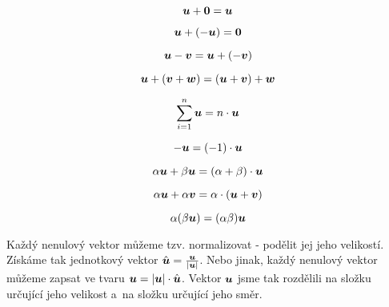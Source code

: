 \begin{fact}
\begin{equation}
\label{eq:euklidovsky_prostor_definice_nuloveho_vektoru}
\boldsymbol{u} + \boldsymbol{0} = \boldsymbol{u}
\end{equation}

\begin{equation}
\label{eq:euklidovsky_prostor_definice_opacneho_vektoru}
\boldsymbol{u} + (-\boldsymbol{u}) = \boldsymbol{0}
\end{equation}

\begin{equation}
\label{eq:euklidovsky_prostor_definice_odecitani_vektoru}
\boldsymbol{u} - \boldsymbol{v} = \boldsymbol{u} + (-\boldsymbol{v})
\end{equation}

\begin{equation}
\label{eq:euklidovsky_prostor_vektor_asociativita_scitani}
\boldsymbol{u} + (\boldsymbol{v} + \boldsymbol{w}) = (\boldsymbol{u} + \boldsymbol{v}) + \boldsymbol{w}
\end{equation}

\begin{equation}
\label{eq:euklidovsky_prostor_definice_nasobeni}
\sum_{i=1}^n \boldsymbol{u} = n \cdot \boldsymbol{u}
\end{equation}

\begin{equation}
\label{eq:euklidovsky_prostor_vektor_opacny}
-\boldsymbol{u} = (-1) \cdot \boldsymbol{u}
\end{equation}

\begin{equation}
\label{eq:euklidovsky_prostor_vektor_distribuce_scitani}
\alpha \boldsymbol{u} + \beta \boldsymbol{u} = (\alpha + \beta) \cdot \boldsymbol{u}
\end{equation}

\begin{equation}
\label{eq:euklidovsky_prostor_vektor_distribuce_nasobeni}
\alpha \boldsymbol{u} + \alpha \boldsymbol{v} = \alpha \cdot (\boldsymbol{u} + \boldsymbol{v})
\end{equation}

\begin{equation}
\label{eq:euklidovsky_prostor_asociativita_nasobeni}
\alpha (\beta \boldsymbol{u}) = (\alpha \beta) \boldsymbol{u}
\end{equation}
\end{fact}

Každý nenulový vektor můžeme tzv. normalizovat - podělit jej jeho velikostí. Získáme tak jednotkový vektor \(\hat{\boldsymbol{u}} = \frac{\boldsymbol{u}}{|\boldsymbol{u}|}\). Nebo jinak, každý nenulový vektor můžeme zapsat ve tvaru \(\boldsymbol{u} = |\boldsymbol{u}| \cdot \hat{\boldsymbol{u}}\). Vektor \(\boldsymbol{u}\) jsme tak rozdělili na složku určující jeho velikost a~na složku určující jeho směr.

